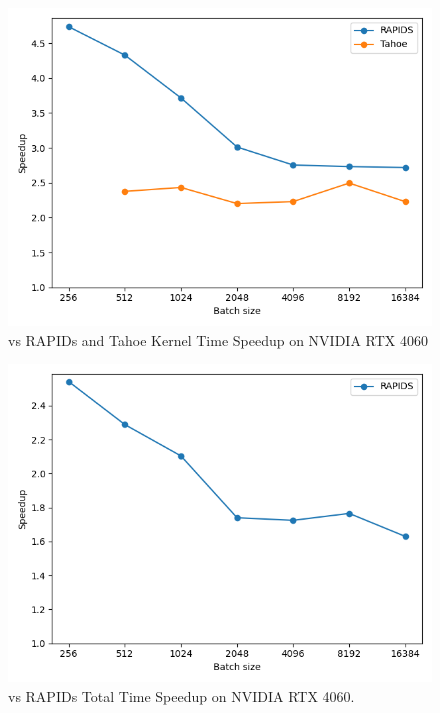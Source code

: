 \begin{figure}[htb]
  \centering
  \includegraphics[width=0.75\linewidth]{figures/geomean_speedup_4060_kernel_time.png}
  \caption{\Treebeard{} vs RAPIDs and Tahoe Kernel Time Speedup on NVIDIA RTX 4060}
  \label{Fig:TBvsRAPIDsTahoe_4060_Speedup}
\end{figure}

\begin{figure}[htb]
  \centering
  \includegraphics[width=0.75\linewidth]{figures/geomean_speedup_4060_total_time.png}
  \caption{\Treebeard{} vs RAPIDs Total Time Speedup on NVIDIA RTX 4060.}
  \label{Fig:TBvsRAPIDs_4060_TotalTimeSpeedup}
\end{figure}

